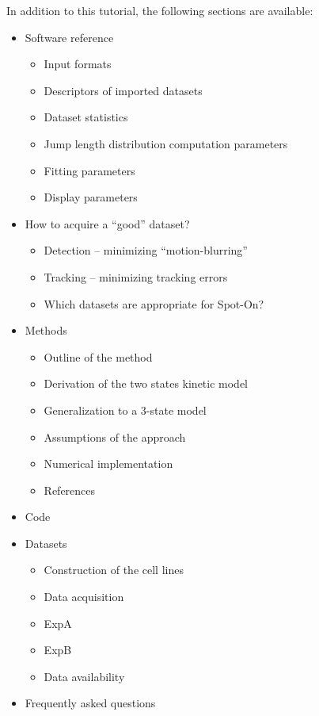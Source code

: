 In addition to this tutorial, the following sections are available:
\begin{itemize}
\item{
  Software reference
  \begin{itemize}
  \item  Input formats
  \item      Descriptors of imported datasets
  \item      Dataset statistics
  \item      Jump length distribution computation parameters
  \item      Fitting parameters
  \item      Display parameters
  \end{itemize}
}
\item{   How to acquire a ``good'' dataset?
  \begin{itemize}
  \item      Detection – minimizing “motion-blurring”
  \item      Tracking – minimizing tracking errors
  \item      Which datasets are appropriate for Spot-On?
  \end{itemize}  
}
\item{
  Methods
  \begin{itemize}
  \item      Outline of the method
  \item      Derivation of the two states kinetic model
  \item      Generalization to a 3-state model
  \item      Assumptions of the approach
  \item      Numerical implementation
  \item      References
  \end{itemize}
}
\item{Code}
\item{  
  Datasets
  \begin{itemize}
  \item      Construction of the cell lines
  \item      Data acquisition
  \item      ExpA
  \item      ExpB
  \item      Data availability
  \end{itemize}
}
\item{    
  Frequently asked questions
  \begin{itemize}

\end{itemize}}
\end{itemize}

